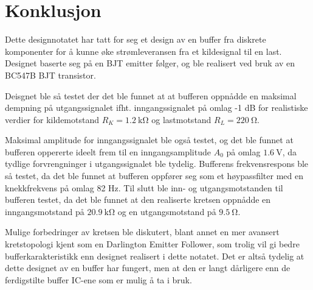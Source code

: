 \newpage
\section{Konklusjon}
\label{konklusjon}

Dette designnotatet har tatt for seg et design av en buffer fra diskrete komponenter for å kunne 
øke strømleveransen fra et kildesignal til en last. Designet baserte seg på en BJT emitter følger,
og ble realisert ved bruk av en BC547B BJT transistor. 

Deisgnet ble så testet der det ble funnet at at bufferen oppnådde en maksimal dempning på 
utgangssignalet ifht. inngangssignalet på omlag -1 dB for realistiske verdier for kildemotstand 
$R_K = \SI{1.2}{\kilo\ohm}$ og lastmotstand $R_L = \SI{220}{\ohm}$.

Maksimal amplitude for inngangssignalet ble også testet, og det ble funnet at bufferen oppererte ideelt frem til
en inngangsamplitude $A_0$ på omlag $\SI{1.6}{\volt}$, da tydlige forvrengninger i utgangssignalet ble tydelig.
Bufferens frekvensrespons ble så testet, da det ble funnet at bufferen oppfører seg som et høypassfilter med en 
knekkfrekvens på omlag 82 Hz. Til slutt ble inn- og utgangsmotstanden til bufferen testet, da det ble funnet 
at den realiserte kretsen oppnådde en inngangsmotstand på $\SI{20.9}{\kilo\ohm}$ og en utgangsmotstand på 
$\SI{9.5}{\ohm}$.

Mulige forbedringer av kretsen ble diskutert, blant annet en mer avansert kretstopologi kjent som en
Darlington Emitter Follower, som trolig vil gi bedre bufferkarakteristikk enn designet realisert i dette notatet.
Det er altså tydelig at dette designet av en buffer har fungert, men at den er langt dårligere enn 
de ferdigstilte buffer IC-ene som er mulig å ta i bruk.
